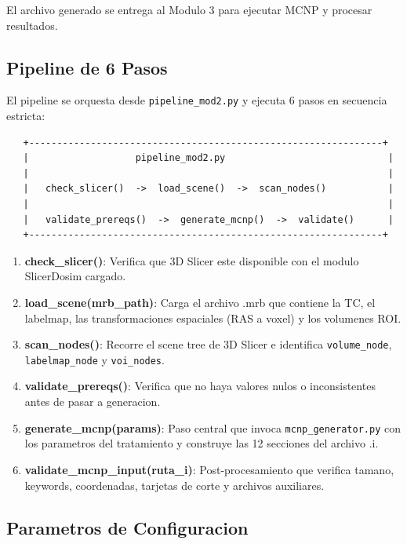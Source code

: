 \documentclass[12pt,a4paper]{article}
\begin{document}
El archivo generado se entrega al Modulo 3 para ejecutar MCNP y procesar resultados.

\subsection{Pipeline de 6 Pasos}

El pipeline se orquesta desde \texttt{pipeline\_mod2.py} y ejecuta 6 pasos en secuencia estricta:

\begin{verbatim}
   +---------------------------------------------------------------+
   |                   pipeline_mod2.py                             |
   |                                                                |
   |   check_slicer()  ->  load_scene()  ->  scan_nodes()           |
   |                                                                |
   |   validate_prereqs()  ->  generate_mcnp()  ->  validate()      |
   +---------------------------------------------------------------+
\end{verbatim}

\begin{enumerate}
    \item \textbf{check\_slicer()}: Verifica que 3D Slicer este disponible con el modulo SlicerDosim cargado.
    \item \textbf{load\_scene(mrb\_path)}: Carga el archivo .mrb que contiene la TC, el labelmap, las transformaciones espaciales (RAS a voxel) y los volumenes ROI.
    \item \textbf{scan\_nodes()}: Recorre el scene tree de 3D Slicer e identifica \texttt{volume\_node}, \texttt{labelmap\_node} y \texttt{voi\_nodes}.
    \item \textbf{validate\_prereqs()}: Verifica que no haya valores nulos o inconsistentes antes de pasar a generacion.
    \item \textbf{generate\_mcnp(params)}: Paso central que invoca \texttt{mcnp\_generator.py} con los parametros del tratamiento y construye las 12 secciones del archivo .i.
    \item \textbf{validate\_mcnp\_input(ruta\_i)}: Post-procesamiento que verifica tamano, keywords, coordenadas, tarjetas de corte y archivos auxiliares.
\end{enumerate}

\subsection{Parametros de Configuracion}
\end{document}
